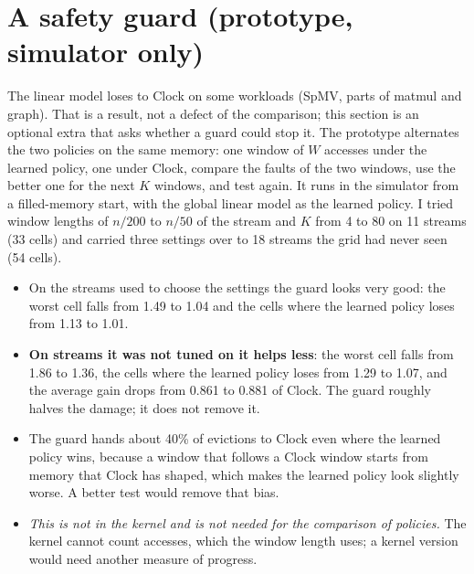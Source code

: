 \documentclass[10.5pt,a4paper]{article}
\begin{document}
\section{A safety guard (prototype, simulator only)}
\label{sec:guard}

The linear model loses to Clock on some workloads (SpMV, parts of matmul and graph). That is a result, not a defect of the comparison; this section is an optional extra that asks whether a guard could stop it. The prototype alternates the two policies on the same memory:
one window of $W$ accesses under the learned policy, one under Clock, compare the faults of the two windows, use the better one for the next $K$ windows, and test again.
It runs in the simulator from a filled-memory start, with the global linear model as the learned policy. I tried window lengths of $n/200$ to $n/50$ of the stream
and $K$ from 4 to 80 on 11 streams (33 cells) and carried three settings over to 18 streams the grid had never seen (54 cells).

\begin{table}[h]
\centering\small

\caption{Streams the settings were chosen on (faults relative to Clock; ``all cells'' is the geometric mean).}
\end{table}

\begin{table}[h]
\centering\small

\caption{Streams the settings were not chosen on.}
\end{table}

\begin{itemize}
\item On the streams used to choose the settings the guard looks very good: the worst cell falls from 1.49 to 1.04 and the cells where the learned policy loses from 1.13 to 1.01.
\item \textbf{On streams it was not tuned on it helps less}: the worst cell falls from 1.86 to 1.36, the cells where the learned policy loses from 1.29 to 1.07, and the average
  gain drops from 0.861 to 0.881 of Clock. The guard roughly halves the damage; it does not remove it.
\item The guard hands about 40\% of evictions to Clock even where the learned policy wins, because a window that follows a Clock window starts from memory that Clock has shaped, which
  makes the learned policy look slightly worse. A better test would remove that bias.
\item \emph{This is not in the kernel and is not needed for the comparison of policies.} The kernel cannot count accesses, which the window length uses; a kernel version would need another measure of progress.
\end{itemize}
\end{document}
